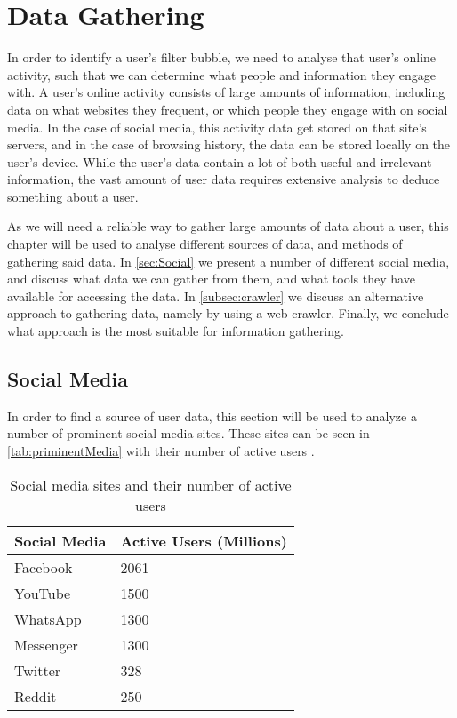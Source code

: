 \chapter{Data Gathering}\label{cha:DG}
In order to identify a user's filter bubble, we need to analyse that user's
online activity, such that we can determine what people and information they
engage with. A user's online activity consists of large amounts of information,
including data on what websites they frequent, or which people they engage with
on social media. In the case of social media, this activity data get stored on
that site's servers, and in the case of browsing history, the data can be stored
locally on the user's device. While the user's data contain a lot of both useful
and irrelevant information, the vast amount of user data requires extensive
analysis to deduce something about a user.\nl

As we will need a reliable way to gather large amounts of data about a user,
this chapter will be used to analyse different sources of data, and methods of
gathering said data. In \autoref{sec:Social} we present a number of different
social media, and discuss what data we can gather from them, and what tools they
have available for accessing the data. In \autoref{subsec:crawler} we discuss an
alternative approach to gathering data, namely by using a web-crawler.
Finally, we conclude what approach is the most suitable for information
gathering.

\section{Social Media}\label{sec:Social}
In order to find a source of user data, this section will be used to analyze a
number of prominent social media sites. These sites can be seen in
\autoref{tab:priminentMedia} with their number of active
users \citep{SocialMediaStats, AdvertiseOnReddit}.

\begin{table}[H]\centering
\begin{tabular}{|l|l|}\hline
\textbf{Social Media} & \textbf{Active Users (Millions)}\\\hline
Facebook & 2061 \\\hline
YouTube & 1500 \\\hline
WhatsApp & 1300 \\\hline
Messenger & 1300 \\\hline
Twitter & 328\\\hline
Reddit &  250\\\hline
\end{tabular}
\caption{Social media sites and their number of active users}
\label{tab:priminentMedia}
\end{table}

